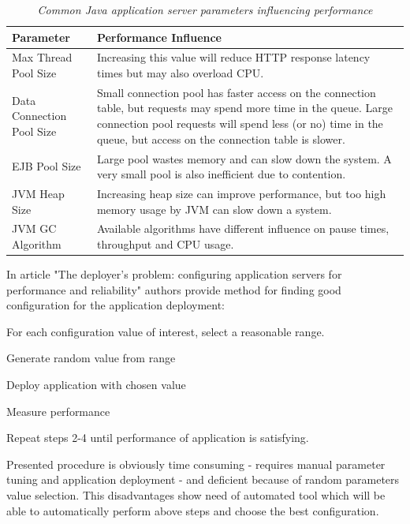 \documentclass[12pt,a4paper]{article}
\let\tmpone\enumerate
\let\tmptwo\endenumerate
\renewenvironment{enumerate}{\tmpone\addtolength{\itemsep}{-0.4\baselineskip}}{\tmptwo}
\begin{document}
\begin{table}[!htb]
\begin{center}
\begin{tabularx}{\textwidth}{p{3cm}|X}
  \textbf{Parameter} & \textbf{Performance Influence} \\
\hline
Max Thread Pool Size & Increasing this value will reduce HTTP response latency times but may also overload CPU.\\
 
Data Connection Pool Size & Small connection pool has faster access on the connection table, but requests may spend more time in the queue. Large connection pool requests will spend less (or no) time in the 
queue, but access on the connection table is slower.\\

EJB Pool Size & Large pool wastes memory and  can slow down the system. A very small pool is also inefficient due to contention. \\

JVM Heap Size & Increasing heap size can improve performance, but too high memory usage by JVM can slow down a system.   \\

JVM GC Algorithm & Available algorithms have different influence on pause 
times, throughput and CPU usage.
\end{tabularx}
\end{center}
\caption{\textit{Common Java application server parameters influencing performance}}
\label{glassfishparams}
\end{table}

In article "The deployer's problem: configuring application servers for performance and reliability" \cite{deployerproblem} authors provide method for finding good configuration for the application deployment:

\begin{enumerate}
\item For each configuration value of interest, select a reasonable range. 
\item Generate random value from range
\item Deploy application with chosen value
\item Measure performance
\item Repeat steps 2-4 until performance of application is satisfying. 
\end{enumerate}

Presented procedure is obviously time consuming - requires manual parameter tuning and application deployment - and deficient because of random parameters value selection. This disadvantages show need of automated tool which will be able to automatically perform above steps and choose the best configuration.
\end{document}
